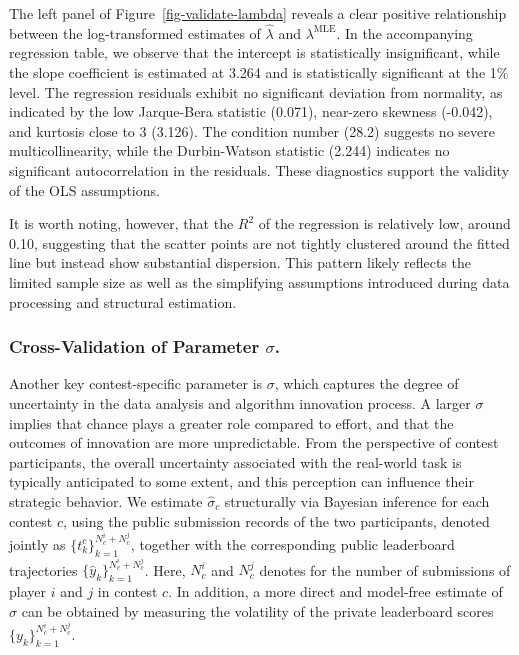 \documentclass[mnsc]{informs3}
\begin{document}
The left panel of Figure~\ref{fig-validate-lambda} reveals a clear positive relationship between the log-transformed estimates of $\hat\lambda$ and $\lambda^{\text{MLE}}$.
In the accompanying regression table, we observe that the intercept is statistically insignificant, while the slope coefficient is estimated at 3.264 and is statistically significant at the 1\% level.
The regression residuals exhibit no significant deviation from normality, as indicated by the low Jarque-Bera statistic (0.071), near-zero skewness (-0.042), and kurtosis close to 3 (3.126). 
The condition number (28.2) suggests no severe multicollinearity, while the Durbin-Watson statistic (2.244) indicates no significant autocorrelation in the residuals. 
These diagnostics support the validity of the OLS assumptions.

It is worth noting, however, that the $R^2$ of the regression is relatively low, around 0.10, suggesting that the scatter points are not tightly clustered around the fitted line but instead show substantial dispersion.
This pattern likely reflects the limited sample size as well as the simplifying assumptions introduced during data processing and structural estimation.




\subsubsection{Cross-Validation of Parameter $\sigma$.}

Another key contest-specific parameter is $\sigma$, which captures the degree of uncertainty in the data analysis and algorithm innovation process. 
A larger $\sigma$ implies that chance plays a greater role compared to effort, and that the outcomes of innovation are more unpredictable. 
From the perspective of contest participants, the overall uncertainty associated with the real-world task is typically anticipated to some extent, and this perception can influence their strategic behavior.
We estimate $\hat{\sigma}_c$ structurally via Bayesian inference for each contest $c$, using the public submission records of the two participants, denoted jointly as $\{t_k^c\}_{k=1}^{N^i_c + N^j_c}$, together with the corresponding public leaderboard trajectories $\{\hat{y}_{k}\}_{k=1}^{N^i_c + N^j_c}$. 
Here, $N^i_c$ and $N^j_c$ denotes for the number of submissions of player $i$ and $j$ in contest $c$. 
In addition, a more direct and model-free estimate of $\sigma$ can be obtained by measuring the volatility of the private leaderboard scores $\{y_k\}_{k=1}^{N^i_c+N^j_c}$.
\end{document}

